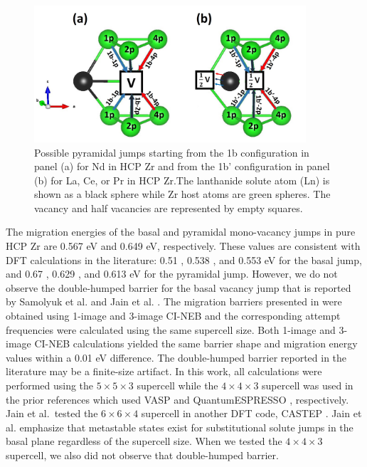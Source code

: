 \documentclass[preprint,12pt]{elsarticle}
\begin{document}
\begin{figure}[h!]
    \centering
    \includegraphics[width=0.9\textwidth]{3_pyramidal_jumps_1b_1bb.jpg}
    \caption{Possible pyramidal jumps starting from the 1b configuration in panel (a) for Nd in HCP Zr and from the 1b' configuration in panel (b) for La, Ce, or Pr in HCP Zr.The lanthanide solute atom (Ln) is shown as a black sphere while Zr host atoms are green spheres. The vacancy and half vacancies are represented by empty squares.}
    \label{fig:pyr_jumps_1b_and_1bb}
\end{figure}

The migration energies of the basal and pyramidal mono-vacancy jumps in pure HCP Zr are 0.567 eV and 0.649 eV, respectively. These values are consistent with DFT calculations in the literature: 0.51 \cite{verite_anisotropy_2007}, 0.538 \cite{samolyuk_analysis_2014}, and 0.553 \cite{jain_first-principles_2019} eV for the basal jump, and  0.67 \cite{verite_anisotropy_2007}, 0.629 \cite{samolyuk_analysis_2014}, and 0.613 \cite{jain_first-principles_2019} eV for the pyramidal jump. However, we do not observe the double-humped barrier for the basal vacancy jump that is reported by Samolyuk et al. \cite{samolyuk_analysis_2014} and Jain et al. \cite{jain_first-principles_2019}. The migration barriers presented in  were obtained using 1-image and 3-image CI-NEB and the corresponding attempt frequencies were calculated using the same supercell size. Both 1-image and 3-image CI-NEB calculations yielded the same barrier shape and migration energy values within a 0.01 eV difference. The double-humped barrier reported in the literature may be a finite-size artifact. In this work, all calculations were performed using the $5\times5\times3$ supercell while the $4\times4\times3$ supercell was used in the prior references \cite{samolyuk_analysis_2014, jain_first-principles_2019} which used VASP \cite{kresse_ab_1993} and QuantumESPRESSO \cite{giannozzi_quantum_2009}, respectively. Jain et al.~tested the $6\times6\times4$ supercell \cite{jain_first-principles_2019} in another DFT code, CASTEP \cite{clark_first_2005}. Jain et al. \cite{jain_first-principles_2019} emphasize that metastable states exist for substitutional solute jumps in the basal plane regardless of the supercell size. When we tested the $4\times4\times3$ supercell, we also did not observe that double-humped barrier.
\end{document}
